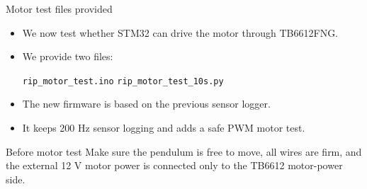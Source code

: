 \documentclass[aspectratio=169]{beamer}
\begin{document}
\begin{frame}{Motor test files provided}

\begin{itemize}
    \item We now test whether STM32 can drive the motor through TB6612FNG.
    \vspace{0.25cm}

    \item We provide two files:
    \vspace{0.15cm}

    \begin{center}
    \texttt{rip\_motor\_test.ino}
    \qquad
    \texttt{rip\_motor\_test\_10s.py}
    \end{center}

    \vspace{0.25cm}

    \item The new firmware is based on the previous sensor logger.
    \vspace{0.25cm}

    \item It keeps 200 Hz sensor logging and adds a safe PWM motor test.
\end{itemize}

\vspace{0.2cm}

\begin{alertblock}{Before motor test}
\small
Make sure the pendulum is free to move, all wires are firm, and the external 12 V motor power is connected only to the TB6612 motor-power side.
\end{alertblock}

\end{frame}
\end{document}
